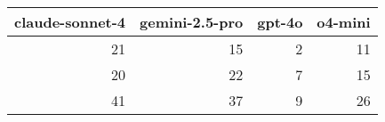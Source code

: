 \begin{tabular}{rrrr}
\toprule
claude-sonnet-4 & gemini-2.5-pro & gpt-4o & o4-mini \\
\midrule
21 & 15 & 2 & 11 \\
20 & 22 & 7 & 15 \\
41 & 37 & 9 & 26 \\
\bottomrule
\end{tabular}
